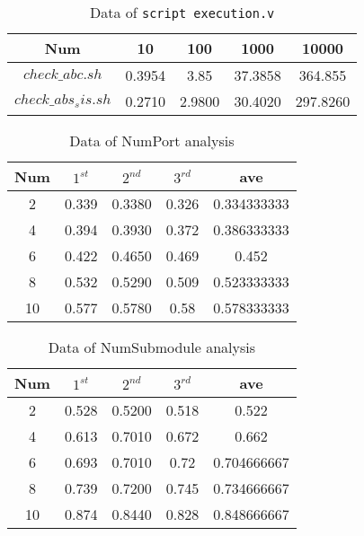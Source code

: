 \begin{table}[htbp]
    \centering
    \begin{tabular}{c|c|c|c|c}
    \hline
        Num & 10 &100&1000&10000\\
        \hline
        $check\_abc.sh$&0.3954 &3.85&37.3858&364.855\\
       $check\_abs_sis.sh$ &0.2710&2.9800&30.4020&297.8260\\
    \end{tabular}
    \caption{\footnotesize Data of \texttt{script execution.v}}
\end{table}

\begin{table}[htbp]
    \centering
    \begin{tabular}{c|c|c|c|c}
    \hline
        Num & $1^{st}$ &$2^{nd}$ &$3^{rd}$ &ave\\
        \hline
        2 &  0.339&	0.3380&	0.326&	0.334333333\\
        4 &0.394&	0.3930&	0.372&	0.386333333
\\
        6 &0.422&	0.4650	&0.469&	0.452
\\
        8 &0.532&	0.5290&	0.509&	0.523333333
\\
        10 &0.577&	0.5780&	0.58&	0.578333333
\\
    \end{tabular}
    \caption{\footnotesize Data of NumPort analysis}
\end{table}

\begin{table}[htbp]
    \centering
    \begin{tabular}{c|c|c|c|c}
    \hline
        Num & $1^{st}$ &$2^{nd}$ &$3^{rd}$ &ave\\
        \hline
        2 &  0.528&	0.5200&	0.518&	0.522
\\
        4 &0.613&	0.7010&	0.672&	0.662

\\
        6 &0.693&	0.7010&	0.72&	0.704666667

\\
        8 &0.739&	0.7200&	0.745&	0.734666667

\\
        10 &0.874&	0.8440&	0.828&	0.848666667

\\
    \end{tabular}
    \caption{\footnotesize Data of NumSubmodule analysis}
\end{table}
